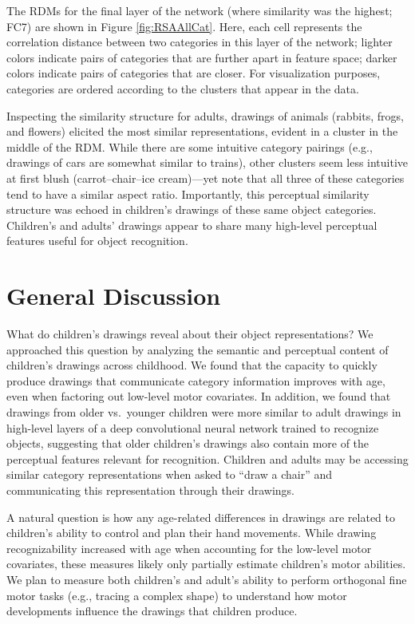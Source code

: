 \documentclass[10pt, letterpaper]{article}
\begin{document}
The RDMs for the final layer of the network (where similarity was the
highest; FC7) are shown in Figure \ref{fig:RSAAllCat}. Here, each cell
represents the correlation distance between two categories in this layer
of the network; lighter colors indicate pairs of categories that are
further apart in feature space; darker colors indicate pairs of
categories that are closer. For visualization purposes, categories are
ordered according to the clusters that appear in the data.

Inspecting the similarity structure for adults, drawings of animals
(rabbits, frogs, and flowers) elicited the most similar representations,
evident in a cluster in the middle of the RDM. While there are some
intuitive category pairings (e.g., drawings of cars are somewhat similar
to trains), other clusters seem less intuitive at first blush
(carrot--chair--ice cream)---yet note that all three of these categories
tend to have a similar aspect ratio. Importantly, this perceptual
similarity structure was echoed in children's drawings of these same
object categories. Children's and adults' drawings appear to share many
high-level perceptual features useful for object recognition.

\section{General Discussion}\label{general-discussion}

What do children's drawings reveal about their object representations?
We approached this question by analyzing the semantic and perceptual
content of children's drawings across childhood. We found that the
capacity to quickly produce drawings that communicate category
information improves with age, even when factoring out low-level motor
covariates. In addition, we found that drawings from older vs.~younger
children were more similar to adult drawings in high-level layers of a
deep convolutional neural network trained to recognize objects,
suggesting that older children's drawings also contain more of the
perceptual features relevant for recognition. Children and adults may be
accessing similar category representations when asked to ``draw a
chair'' and communicating this representation through their drawings.

A natural question is how any age-related differences in drawings are
related to children's ability to control and plan their hand movements.
While drawing recognizability increased with age when accounting for the
low-level motor covariates, these measures likely only partially
estimate children's motor abilities. We plan to measure both children's
and adult's ability to perform orthogonal fine motor tasks (e.g.,
tracing a complex shape) to understand how motor developments influence
the drawings that children produce.
\end{document}
